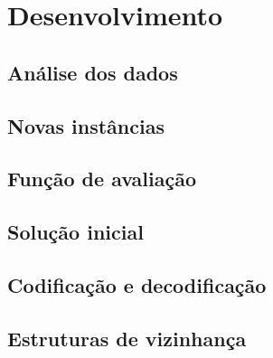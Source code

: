 \chapter{Desenvolvimento} \label{desenvolvimento}


\section{Análise dos dados}

\section{Novas instâncias} 

\section{Função de avaliação}

\section{Solução inicial}

\section{Codificação e decodificação}

\section{Estruturas de vizinhança}

